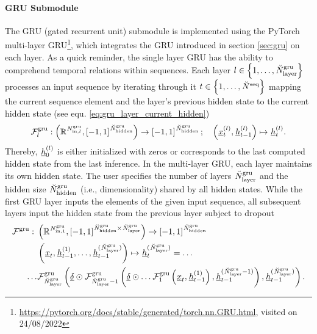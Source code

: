 \newcommand{\GRUMap}{\Func[]{\gru}{}{}{}}
\newcommand{\GRUDropout}{\underline\delta}
\newcommand{\GRUDropoutP}{\prob[\user]{\gru}{}{}{}}
\newcommand{\GRUNumP}{\num[]{\gru}{\params}{}{}}

\paragraph*{GRU Submodule} ${}$\\
The GRU (gated recurrent unit) submodule
is implemented using the PyTorch
multi-layer GRU\footnote{
    \url{https://pytorch.org/docs/stable/generated/torch.nn.GRU.html}, visited on 24/08/2022
},
which integrates the GRU \cite{Cho2014} 
introduced in section \ref{sec:gru} on each layer.
As a quick reminder, 
the single layer GRU 
has the ability to comprehend temporal relations within sequences.
Each layer 
$l \in \setOfInts{1, \dots, \GRUNumLayer}$ 
processes an input sequence by
iterating through it
$t \in \setOfInts{1, \dots, \seqLen}$ 
mapping the current sequence element
and the layer's previous hidden state
to the current hidden state (see equ. \ref{eq:gru_layer_current_hidden})
\begin{align}
    \GRULayerMap{l}
    :
    \tuple{
        \R{\GRUInp{l}}, 
        \setR{-1, 1}^{\GRUHiddenSize}
    }
    \rightarrow 
    \setR{-1, 1}^{\GRUHiddenSize}
    ;\quad
    \tuple{\featvec[]{(l)}{t}{}{}, \hiddenstate[]{(l)}{t-1}{}{}}
    \mapsto
    \hiddenstate[]{(l)}{t}{}{}.
\end{align}
Thereby, $\hiddenstate[]{(l)}{0}{}{}$ is either initialized with zeros 
or corresponds to the last computed hidden state from the last inference.
 In the multi-layer GRU,
each layer maintains its own hidden state.
The user specifies the number of layers 
$\GRUNumLayer$
and the hidden size 
$\GRUHiddenSize$ (i.e., dimensionality) shared by all hidden states.
While the first GRU layer inputs the elements of the given input sequence,
all subsequent layers input the hidden state from the previous layer subject to dropout
\begin{align} \label{eq:gru}
    \GRUMap
    :\ &
    \tuple{
        \R{\GRUInp{1}},
        \setR{-1, 1}^{\GRUHiddenSize \times \GRUNumLayer}
    }
    \rightarrow 
    \setR{-1, 1}^{\GRUHiddenSize}
    \nonumber \\
    &\tuple{
        \featvec[]{}{t}{}{}, 
        \hiddenstate[]{(1)}{t-1}{}{},
        \dots,
        \hiddenstate[]{(\GRUNumLayer)}{t-1}{}{}
    }
    \mapsto 
    \hiddenstate[]{(\GRUNumLayer)}{t}{}{} =
    \dots
    \nonumber \\
    \dots &\GRULayerMap{\GRUNumLayer} \tuple{
        \GRUDropout \odot
        \GRULayerMap{\GRUNumLayer - 1} \tuple{
            \GRUDropout \odot
                \dots \GRULayerMap{1} \tuple{
                    \featvec[]{}{t}{}{}
                    ,
                    \hiddenstate[]{(1)}{t-1}{}{}
                }
            ,
            \hiddenstate[]{(\GRUNumLayer-1)}{t-1}{}{}
        },
        \hiddenstate[]{(\GRUNumLayer)}{t-1}{}{}
    }
    .
\end{align}
